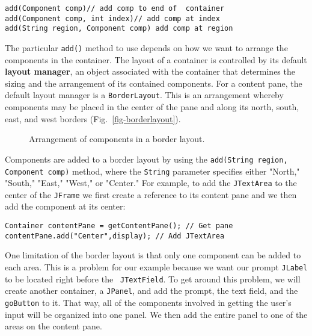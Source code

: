 \begin{jjjlisting}
\begin{lstlisting}
add(Component comp)// add comp to end of  container
add(Component comp, int index)// add comp at index
add(String region, Component comp) add comp at region
\end{lstlisting}
\end{jjjlisting}

\noindent The particular {\tt add()} method to use depends on how we
want to arrange the components in the container. The layout of a
container is controlled by its default {\bf layout manager}, an object
associated with the container that determines the sizing and the
arrangement of its contained components. For a content pane, the
default layout manager is a {\tt BorderLayout}. This is an arrangement
whereby components may be placed in the center of the pane and along
its north, south, east, and west borders
(Fig.~\ref{fig-borderlayout}).
\begin{figure}[h!]
{Arrangement of components in a border layout.
\label{fig-borderlayout}
\label{pg-fig-borderlayout}}
\end{figure}


Components are added to a border layout by using the {\tt add(String
region, Component comp)} method, where the {\tt String} parameter
specifies either "North," "South," "East," "West," or "Center."  For
example, to add the {\tt JTextArea} to the center of the {\tt JFrame}
we first create a reference to its content pane and we then add the component at
its center:

\begin{jjjlisting}
\begin{lstlisting}
Container contentPane = getContentPane(); // Get pane
contentPane.add("Center",display); // Add JTextArea
\end{lstlisting}
\end{jjjlisting}

One limitation of the border layout is that only one component can be
added to each area. This is a problem for our example because we want
our prompt {\tt JLabel} to be located right before the {\tt
JTextField}.  To get around this problem, we will create another
container, a {\tt JPanel}, and add the prompt, the text field, and the
{\tt goButton} to it. That way, all of the components involved in
getting the user's input will be organized into one panel.  We then
add the entire panel to one of the areas on the content pane.

